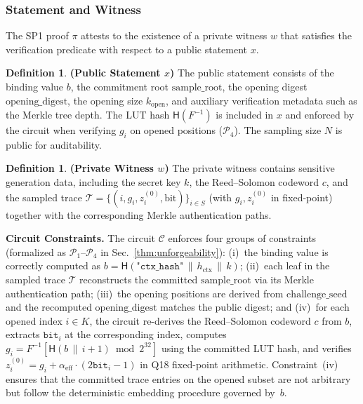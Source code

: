 \documentclass{article}
\theoremstyle{plain}
\theoremstyle{definition}
\newtheorem{definition}[theorem]{Definition}
\theoremstyle{remark}
\begin{document}
\subsubsection{Statement and Witness}
The SP1 proof \(\pi\) attests to the existence of a private witness \(w\) that satisfies the
verification predicate with respect to a public statement \(x\).

\begin{definition}
  \textbf{(Public Statement \(x\))}
  The public statement consists of the binding value \(b\), the commitment root
  \(\mathrm{sample\_root}\), the opening digest \(\mathrm{opening\_digest}\), the opening size
  \(k_{\mathrm{open}}\), and auxiliary verification metadata such as the Merkle tree depth.
  The LUT hash $\mathsf{H}(F^{-1})$ is included in $x$ and enforced by the circuit when verifying $g_i$ on opened positions ($\mathcal{P}_4$). The sampling size $N$ is public for auditability.
\end{definition}

\begin{definition}
  \textbf{(Private Witness \(w\))}
The private witness contains sensitive generation data, including the secret key \(k\),
the Reed--Solomon codeword \(c\), and the sampled trace
\(\mathcal{T} = \{(i, g_i, z_i^{(0)}, \mathrm{bit})\}_{i \in S}\) (with $g_i, z_i^{(0)}$ in fixed-point) together with the corresponding Merkle authentication paths.
\end{definition}

\textbf{Circuit Constraints.}
The circuit \(\mathcal{C}\) enforces four groups of constraints (formalized as $\mathcal{P}_1$--$\mathcal{P}_4$ in Sec.~\ref{thm:unforgeability}):
(i)~the binding value is correctly computed as \(b = \mathsf{H}(\texttt{"ctx\_hash"} \,\|\, h_{\mathrm{ctx}} \,\|\, k)\);
(ii)~each leaf in the sampled trace \(\mathcal{T}\) reconstructs the committed \(\mathrm{sample\_root}\) via its Merkle authentication path;
(iii)~the opening positions are derived from \(\mathrm{challenge\_seed}\) and the recomputed \(\mathrm{opening\_digest}\) matches the public digest; and
(iv)~for each opened index $i \in K$, the circuit re-derives the Reed--Solomon codeword $c$ from $b$, extracts $\mathtt{bit}_i$ at the corresponding index, computes $g_i = F^{-1}[\mathsf{H}(b \,\|\, i{+}1) \bmod 2^{32}]$ using the committed LUT hash, and verifies $z_i^{(0)} = g_i + \alpha_{\mathrm{eff}} \cdot (2\mathtt{bit}_i - 1)$ in Q18 fixed-point arithmetic.
Constraint~(iv) ensures that the committed trace entries on the opened subset are not arbitrary but follow the deterministic embedding procedure governed by~$b$.
\end{document}
